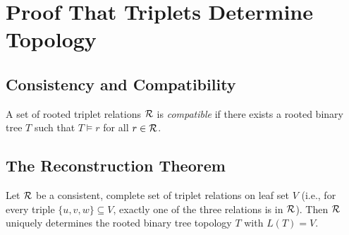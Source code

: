 \chapter{Proof That Triplets Determine Topology}
\label{app:triplet_topology}

\section{Consistency and Compatibility}

\begin{definition}
A set of rooted triplet relations $\mathcal{R}$ is \emph{compatible} if there exists a rooted binary tree $T$ such that $T \models r$ for all $r \in \mathcal{R}$.
\end{definition}

\section{The Reconstruction Theorem}

\begin{theorem}
\label{thm:triplet_det}
Let $\mathcal{R}$ be a consistent, complete set of triplet relations on leaf set $V$ (i.e., for every triple $\{u,v,w\} \subseteq V$, exactly one of the three relations is in $\mathcal{R}$). Then $\mathcal{R}$ uniquely determines the rooted binary tree topology $T$ with $L(T) = V$.
\end{theorem}

